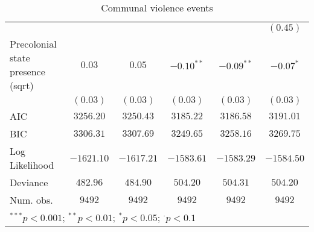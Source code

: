 \begin{sidewaystable}
\begin{center}
{\begin{tabular}{l c c c c c}
                                      &               &              &              &              & $(0.45)$     \\
Precolonial state presence (sqrt)     & $0.03$        & $0.05$       & $-0.10^{**}$ & $-0.09^{**}$ & $-0.07^{*}$  \\
                                      & $(0.03)$      & $(0.03)$     & $(0.03)$     & $(0.03)$     & $(0.03)$     \\
\midrule
AIC                                   & $3256.20$     & $3250.43$    & $3185.22$    & $3186.58$    & $3191.01$    \\
BIC                                   & $3306.31$     & $3307.69$    & $3249.65$    & $3258.16$    & $3269.75$    \\
Log Likelihood                        & $-1621.10$    & $-1617.21$   & $-1583.61$   & $-1583.29$   & $-1584.50$   \\
Deviance                              & $482.96$      & $484.90$     & $504.20$     & $504.31$     & $504.20$     \\
Num. obs.                             & $9492$        & $9492$       & $9492$       & $9492$       & $9492$       \\
\bottomrule
\multicolumn{6}{l}{\scriptsize{$^{***}p<0.001$; $^{**}p<0.01$; $^{*}p<0.05$; $^{\cdot}p<0.1$}}
\end{tabular}
}
\caption{Communal violence events}
\label{org3}
\end{center}
\end{sidewaystable}
